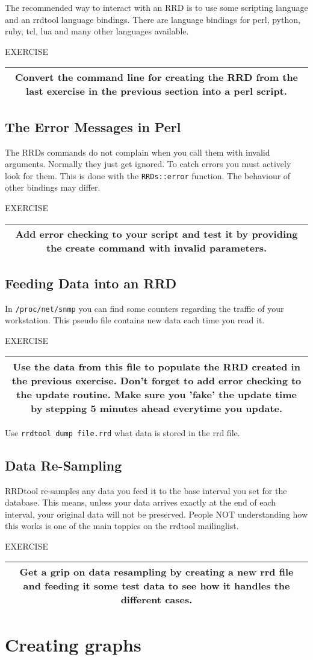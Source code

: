 \documentclass[a4paper,12pt]{article}
\newenvironment{work}{\textsf{\tiny EXERCISE}\nopagebreak\\[0.3ex]\begin{tabular}{|c|}
 \hline
 \begin{minipage}{0.965\linewidth}%
 \setlength{\parskip}{1.6ex plus 0.6ex minus 0.4ex}%
 \rule{0pt}{2.8ex}\ignorespaces}
{\rule[-1.8ex]{0pt}{0pt}\end{minipage}\\
 \hline
 \end{tabular}}
\newcommand{\ex}[1]{\subsection{#1}}
\newcommand{\cmd}[1]{\texttt{\mbox{#1}}}
\begin{document}
The recommended way to interact with an RRD is to use some scripting
language and an rrdtool language bindings. There are language bindings for
perl, python, ruby, tcl, lua and many other languages available.

\begin{work}
Convert the command line for creating the RRD from the last exercise
in the previous section into a perl script.
\end{work}

\ex{The Error Messages in Perl}
The RRDs commands do not complain when you call them with invalid
arguments. Normally they just get ignored. To catch errors you must
actively look for them. This is done with the \cmd{RRDs::error}
function. The behaviour of other bindings may differ.

\begin{work}
Add error checking to your script and test it by providing the
create command with invalid parameters.
\end{work}

\newpage
\ex{Feeding Data into an RRD}
In \cmd{/proc/net/snmp} you can find some counters regarding the
traffic of your workstation. This pseudo file contains new data each time you read it.

\begin{work}
  Use the data from this file to populate the RRD created in the previous
  exercise. Don't forget to add error checking to the update routine. Make
  sure you 'fake' the update time by stepping 5 minutes ahead everytime you
  update.
\end{work}

Use \cmd{rrdtool dump file.rrd} what data is stored in the rrd file.

\ex{Data Re-Sampling}

RRDtool re-samples any data you feed it to the base interval you set for the
database. This means, unless your data arrives exactly at the end of each
interval, your original data will not be preserved. People NOT understanding
how this works is one of the main toppics on the rrdtool mailinglist.

\begin{work}
Get a grip on data resampling by creating a new rrd file and feeding it some
test data to see how it handles the different cases.
\end{work}

\newpage
\section{Creating graphs}
\end{document}
